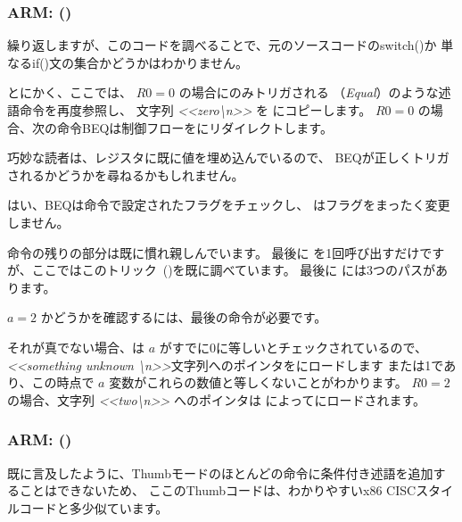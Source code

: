 ﻿\subsubsection{ARM: \OptimizingKeilVI (\ARMMode)}



繰り返しますが、このコードを調べることで、元のソースコードのswitch()か
単なるif()文の集合かどうかはわかりません。


とにかく、ここでは、 $R0=0$ の場合にのみトリガされる \ADREQ（\emph{Equal}）のような述語命令を再度参照し、
文字列 \emph{<<zero\textbackslash{}n>>} を  にコピーします。
$R0=0$ の場合、次の命令\ac{BEQ}は制御フローをにリダイレクトします。

巧妙な読者は、レジスタに既に値を埋め込んでいるので、
\ac{BEQ}が正しくトリガされるかどうかを尋ねるかもしれません。

はい、\ac{BEQ}は\CMP 命令で設定されたフラグをチェックし、
\ADREQ はフラグをまったく変更しません。

命令の残りの部分は既に慣れ親しんでいます。
最後に \printf を1回呼び出すだけですが、ここではこのトリック~()を既に調べています。
最後に \printf{} には3つのパスがあります。

$a=2$ かどうかを確認するには、最後の命令が必要です。

それが真でない場合、\ADRNE は $a$ がすでに0に等しいとチェックされているので、
\emph{<<something unknown \textbackslash{}n>>}文字列へのポインタをにロードします 
または1であり、この時点で $a$ 変数がこれらの数値と等しくないことがわかります。
$R0=2$ の場合、文字列 \emph{<<two\textbackslash{}n>>} へのポインタは \ADREQ によってにロードされます。

\subsubsection{ARM: \OptimizingKeilVI (\ThumbMode)}




既に言及したように、Thumbモードのほとんどの命令に条件付き述語を追加することはできないため、
ここのThumbコードは、わかりやすいx86 \ac{CISC}スタイルコードと多少似ています。

